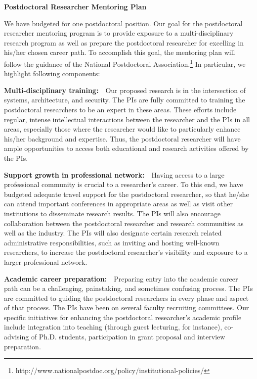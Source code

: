 \begin{center}
{\bf \large{Postdoctoral Researcher Mentoring Plan}} 
\end{center}


We have budgeted for one postdoctoral position. 
Our goal for the postdoctoral researcher mentoring program is to
provide exposure to a multi-disciplinary research program as well as
prepare the postdoctoral researcher for excelling in his/her chosen
career path.  To accomplish this goal, the mentoring plan will follow
the guidance of the National Postdoctoral
Association.\footnote{{http://www.nationalpostdoc.org/policy/institutional-policies/}} In
particular, we highlight following components:

\vspace{+2mm}

{\bf Multi-disciplinary training:}~~Our proposed research is in
  the intersection of systems, architecture, and security. The PIs are fully
  committed to training the postdoctoral researchers to be an expert in
  these areas. These efforts include regular, intense intellectual interactions
 between the researcher and the PIs in all areas, especially those
  where the researcher would like to particularly enhance his/her
  background and expertise. 
  Thus, the postdoctoral researcher will
  have ample opportunities to access both educational and research
  activities offered by the PIs.
  
\vspace{+2mm}

{\bf Support growth in professional network:}~~Having access to a
  large professional community is crucial to a researcher's career. To
  this end, we have budgeted adequate travel support for the
  postdoctoral researcher, so that he/she can attend important
  conferences in appropriate areas as well as visit other
  institutions to disseminate research results. The PIs will also
  encourage collaboration between the postdoctoral researcher and
  research communities  as
  well as the industry. The PIs will also designate certain research
  related administrative responsibilities, such as inviting and
  hosting well-known researchers, to increase the postdoctoral
  researcher's visibility and exposure to a larger professional
  network.
  
\vspace{+2mm}

{\bf Academic career preparation:}~~Preparing entry into the academic
  career path can be a challenging, painstaking, and sometimes
  confusing process. The PIs are committed to guiding the postdoctoral
  researchers in every phase and aspect of that process. The PIs
 have been on
  several faculty recruiting committees.  
  Our specific initiatives for enhancing the postdoctoral researcher's
  academic profile include integration into teaching (through guest
  lecturing, for instance), co-advising of Ph.D. students,
  participation in grant proposal and interview preparation.
  
